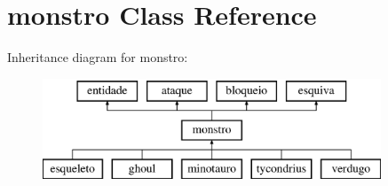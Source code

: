 \hypertarget{classmonstro}{}\section{monstro Class Reference}
\label{classmonstro}
Inheritance diagram for monstro\+:\begin{figure}[H]
\begin{center}
\leavevmode
\includegraphics[height=3.000000cm]{classmonstro}
\end{center}
\end{figure}
